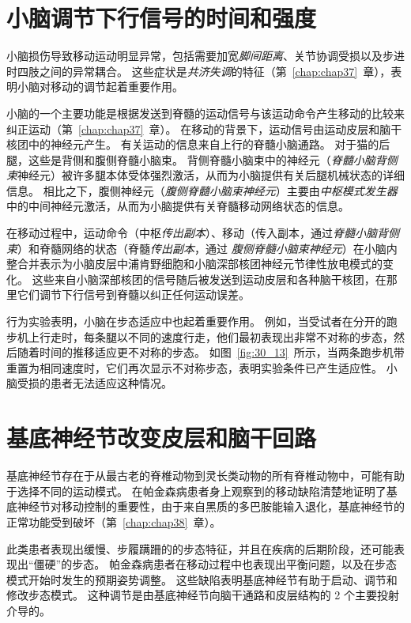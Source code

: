 \section{小脑调节下行信号的时间和强度}

小脑损伤导致移动运动明显异常，包括需要加宽\textit{脚间距离}、关节协调受损以及步进时四肢之间的异常耦合。
这些症状是\textit{共济失调}的特征（第~\ref{chap:chap37}~章），表明小脑对移动的调节起着重要作用。


小脑的一个主要功能是根据发送到脊髓的运动信号与该运动命令产生移动的比较来纠正运动（第~\ref{chap:chap37}~章）。
在移动的背景下，运动信号由运动皮层和脑干核团中的神经元产生。
有关运动的信息来自上行的脊髓小脑通路。
对于猫的后腿，这些是背侧和腹侧脊髓小脑束。
背侧脊髓小脑束中的神经元（\textit{脊髓小脑背侧束}神经元）被许多腿本体受体强烈激活，从而为小脑提供有关后腿机械状态的详细信息。
相比之下，腹侧神经元（\textit{腹侧脊髓小脑束神经元}）主要由\textit{中枢模式发生器}中的中间神经元激活，从而为小脑提供有关脊髓移动网络状态的信息。


在移动过程中，运动命令（中枢\textit{传出副本}）、移动（传入副本，通过\textit{脊髓小脑背侧束}）和脊髓网络的状态（脊髓\textit{传出副本}，通过 \textit{腹侧脊髓小脑束神经元}）在小脑内整合并表示为小脑皮层中浦肯野细胞和小脑深部核团神经元节律性放电模式的变化。
这些来自小脑深部核团的信号随后被发送到运动皮层和各种脑干核团，在那里它们调节下行信号到脊髓以纠正任何运动误差。


行为实验表明，小脑在步态适应中也起着重要作用。
例如，当受试者在分开的跑步机上行走时，每条腿以不同的速度行走，他们最初表现出非常不对称的步态，然后随着时间的推移适应更不对称的步态。
如图~\ref{fig:30_13}~所示，当两条跑步机带重置为相同速度时，它们再次显示不对称步态，表明实验条件已产生适应性。
小脑受损的患者无法适应这种情况。



\section{基底神经节改变皮层和脑干回路}

基底神经节存在于从最古老的脊椎动物到灵长类动物的所有脊椎动物中，可能有助于选择不同的运动模式。
在帕金森病患者身上观察到的移动缺陷清楚地证明了基底神经节对移动控制的重要性，由于来自黑质的多巴胺能输入退化，基底神经节的正常功能受到破坏（第~\ref{chap:chap38}~章）。


此类患者表现出缓慢、步履蹒跚的的步态特征，并且在疾病的后期阶段，还可能表现出“僵硬”的步态。
帕金森病患者在移动过程中也表现出平衡问题，以及在步态模式开始时发生的预期姿势调整。
这些缺陷表明基底神经节有助于启动、调节和修改步态模式。
这种调节是由基底神经节向脑干通路和皮层结构的 2 个主要投射介导的。


